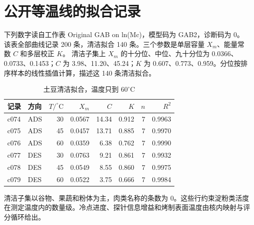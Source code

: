 \section{公开等温线的拟合记录}
下列数字读自工作表 Original GAB on ln(Mc)，模型码为 GAB2，诊断码为 0。该表全部曲线记录 200 条，清洁拟合 140 条。三个参数是单层容量 $X_m$、能量常数 $C$ 和多层校正 $K$。
清洁子集上 $X_m$ 的十分位、中位、九十分位为 0.0366、0.0733、0.1453；$C$ 为 3.98、11.20、45.24；$K$ 为 0.607、0.773、0.959。分位按排序样本的线性插值计算，描述这 140 条清洁拟合。
\begin{table}[ht]
\centering
\caption{土豆清洁拟合，温度只到 $60^\circ\mathrm{C}$}
\begin{tabular}{llrrrrrr}
\toprule
记录 & 方向 & $T/^\circ\mathrm{C}$ & $X_m$ & $C$ & $K$ & $n$ & $R^2$ \\
\midrule
c074 & ADS & 30 & 0.0567 & 14.34 & 0.912 & 7 & 0.9963 \\
c075 & ADS & 45 & 0.0457 & 13.71 & 0.885 & 7 & 0.9970 \\
c076 & ADS & 60 & 0.0359 & 6.38 & 0.762 & 7 & 0.9990 \\
c077 & DES & 30 & 0.0763 & 9.21 & 0.861 & 7 & 0.9932 \\
c078 & DES & 45 & 0.0549 & 8.55 & 0.860 & 7 & 0.9975 \\
c079 & DES & 60 & 0.0522 & 3.75 & 0.666 & 7 & 0.9984 \\
\bottomrule
\end{tabular}
\end{table}
清洁子集以谷物、果蔬和粉体为主，肉类名称的条数为 0。这些行约束淀粉类活度在测定温度内的数量级。冷点进度、探针信息增益和烤制表面温度由核内映射与评分循环给出。
